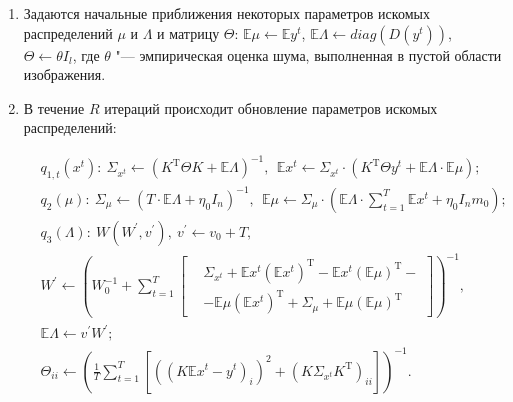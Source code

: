 \begin{enumerate}[beginpenalty=10000]
	\item Задаются начальные приближения некоторых параметров искомых распределений $\mu$ и $\Lambda$ и матрицу $\Theta$: $\mathbb{E}\mu \gets \mathbb{E}y^t$, $\mathbb{E}\Lambda \gets diag\left(D\left( y^t \right)\right)$, $\Theta \gets \theta I_l$, где $\theta$ "--- эмпирическая оценка шума, выполненная в пустой области изображения.
	
	\item В течение $R$ итераций происходит обновление параметров искомых распределений:
	
	\begin{align*}
		&q_{1,t}\left(x^t\right):\ \Sigma_{x^t} \gets \left(K^\mathrm{T} \Theta K+\mathbb{E}\Lambda\right)^{-1},\ \ \mathbb{E}x^t \gets \Sigma_{x^t} \cdot \left(K^\mathrm{T} \Theta y^t+\mathbb{E}\Lambda\cdot\mathbb{E}\mu\right); \\
		&q_2\left(\mu\right):\ \Sigma_\mu \gets \left(T\cdot\mathbb{E}\Lambda+\eta_0 I_n\right)^{-1},\ \ \mathbb{E}\mu \gets \Sigma_\mu \cdot \left(\mathbb{E}\Lambda\cdot\sum_{t=1}^{T}{\mathbb{E}x^t}+\eta_0 I_nm_0\right); \\
		&q_3\left(\Lambda\right):\ W\left(W^\prime,v^\prime\right),\ v^\prime \gets v_0+T, \\
		&W^\prime \gets \left(W_0^{-1}+\sum_{t=1}^{T}\left[
		\begin{aligned}
			&\Sigma_{x^t} + \mathbb{E}x^t\left(\mathbb{E}x^t\right)^\mathrm{T} - \mathbb{E}x^t\left(\mathbb{E}\mu\right)^\mathrm{T} - \\
			&- \mathbb{E}\mu\left(\mathbb{E}x^t\right)^\mathrm{T} + \Sigma_\mu + \mathbb{E}\mu\left(\mathbb{E}\mu\right)^\mathrm{T}
		\end{aligned}
		\right]\right)^{-1}, \\
		&\mathbb{E}\Lambda \gets v^\prime W^\prime; \\
		&\Theta_{ii} \gets \left(\frac{1}{T}\sum_{t=1}^{T}\left[\left(\left(K\mathbb{E}x^t - y^t\right)_i\right)^2 + \left(K\Sigma_{x^t}K^\mathrm{T}\right)_{ii}\right]\right)^{-1}.
	\end{align*}
	
\end{enumerate}

